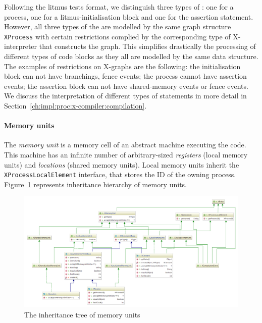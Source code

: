 Following the litmus tests format, we distinguish three types of \xgraph{}: one for a process, one for a litmus-initialisation block and one for the assertion statement.
However, all three types of the \xgraph{} are modelled by the same graph structure \texttt{XProcess} with certain restrictions complied by the corresponding type of X-interpreter that constructs the graph. %
This simplifies drastically the processing of different types of code blocks as they all are modelled by the same data structure.
The examples of restrictions on X-graphs are the following: the initialisation block can not have branchings, fence events; the process cannot have assertion events; the assertion block can not have shared-memory events or fence events.
We discuss the interpretation of different types of statements in more detail in Section~\ref{ch:impl:proc:x-compiler:compilation}.

\paragraph{Memory units}
\label{ch:impl:model:xgraph:mem}

The \textit{memory unit} is a memory cell of an abstract machine executing the code.
This machine has an infinite number of arbitrary-sized \textit{registers} (local memory units) and \textit{locations} (shared memory units).
Local memory units inherit the \texttt{XProcessLocalElement} interface, that stores the ID of the owning process.
Figure~\ref{fig:class-diagrams:XMemoryUnit} represents inheritance hierarchy of memory units.

\begin{figure}[t]%
  \centering
  \includegraphics[width=\textwidth,height=\textheight,keepaspectratio]{img/my/class-diagrams/XMemoryUnit-m.png}
  \caption{The inheritance tree of \xgraph{} memory units}
  \label{fig:class-diagrams:XMemoryUnit}
\end{figure}


